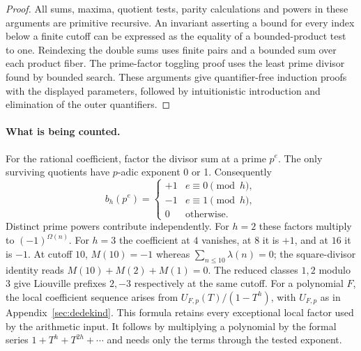 \begin{proof}
All sums, maxima, quotient tests, parity calculations and powers in these arguments are primitive recursive. An invariant asserting a bound for every index below a finite cutoff can be expressed as the equality of a bounded-product test to one. Reindexing the double sums uses finite pairs and a bounded sum over each product fiber. The prime-factor toggling proof uses the least prime divisor found by bounded search. These arguments give quantifier-free induction proofs with the displayed parameters, followed by intuitionistic introduction and elimination of the outer quantifiers.
\end{proof}

\paragraph{What is being counted.}
For the rational coefficient, factor the divisor sum at a prime $p^e$. The only surviving quotients have $p$-adic exponent 0 or 1. Consequently
\[
 b_h(p^e)=
 \begin{cases}
  +1 & e\equiv0\pmod h,\\
  -1 & e\equiv1\pmod h,\\
  0 & \text{otherwise}.
 \end{cases}
\]
Distinct prime powers contribute independently. For $h=2$ these factors multiply to $(-1)^{\Omega(n)}$. For $h=3$ the coefficient at $4$ vanishes, at $8$ it is $+1$, and at $16$ it is $-1$. At cutoff $10$, $M(10)=-1$ whereas $\sum_{n\le 10}\lambda(n)=0$; the square-divisor identity reads $M(10)+M(2)+M(1)=0$. The reduced classes $1,2$ modulo $3$ give Liouville prefixes $2,-3$ respectively at the same cutoff.
For a polynomial $F$, the local coefficient sequence arises from
$U_{F,p}(T)/(1-T^h)$, with $U_{F,p}$ as in Appendix~\ref{sec:dedekind}. This formula retains every exceptional local factor used by the arithmetic input. It follows by multiplying a polynomial by the formal series $1+T^h+T^{2h}+\cdots$ and needs only the terms through the tested exponent.


